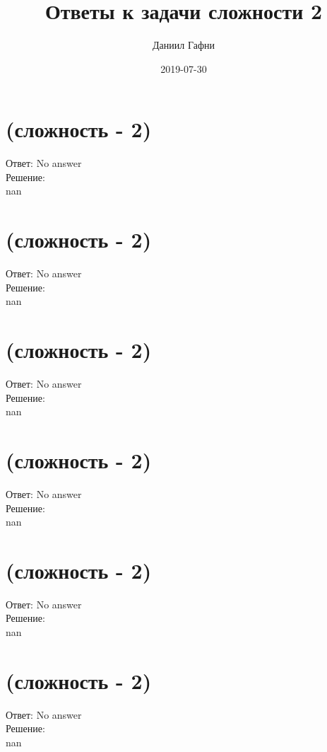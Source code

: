 \documentclass{article}%
\title{Ответы к задачи сложности 2}%
\author{Даниил Гафни}%
\date{2019{-}07{-}30}%
\begin{document}
%
\normalsize%
\maketitle%
\section{(сложность {-} 2)}%
\label{sec:( {-} 2)}%
\hspace{3ex} Ответ: No answer \\%
%
\hspace*{3ex} Решение: \\%
nan

%
\section{(сложность {-} 2)}%
\label{sec:( {-} 2)}%
\hspace{3ex} Ответ: No answer \\%
%
\hspace*{3ex} Решение: \\%
nan

%
\section{(сложность {-} 2)}%
\label{sec:( {-} 2)}%
\hspace{3ex} Ответ: No answer \\%
%
\hspace*{3ex} Решение: \\%
nan

%
\section{(сложность {-} 2)}%
\label{sec:( {-} 2)}%
\hspace{3ex} Ответ: No answer \\%
%
\hspace*{3ex} Решение: \\%
nan

%
\section{(сложность {-} 2)}%
\label{sec:( {-} 2)}%
\hspace{3ex} Ответ: No answer \\%
%
\hspace*{3ex} Решение: \\%
nan

%
\section{(сложность {-} 2)}%
\label{sec:( {-} 2)}%
\hspace{3ex} Ответ: No answer \\%
%
\hspace*{3ex} Решение: \\%
nan
\end{document}

